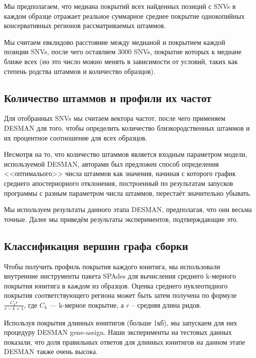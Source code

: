 \documentclass{spbau-diploma}
\begin{document}
Мы предполагаем, что медиана покрытий всех найденных позиций с SNVs в каждом образце отражает реальное суммарное среднее покрытие однокопийных консервативных регионов рассматриваемых штаммов. 

Мы считаем евклидово расстояние между медианой и покрытием каждой позиции SNVs, после чего оставляем 3000 SNVs, покрытие которых к медиане ближе всех (но это число можно менять в зависимости от условий, таких как степень родства штаммов и количество образцов).

\subsection{Количество штаммов и профили их частот}

Для отобранных SNVs мы считаем вектора частот, после чего применяем DESMAN для того, чтобы определить количество близкородственных штаммов и их процентное соотношение для всех образцов. 

Несмотря на то, что количество штаммов является входным параметром модели, используемой DESMAN, авторами был предложен способ определения <<оптималього>> числа штаммов как значения, начиная с которого график среднего апостериорного отклонения, построенный по результатам запусков программы с разным параметром числа штаммов, перестаёт значительно убывать. 

Мы используем результаты данного этапа DESMAN, предполагая, что они весьма точные. Далее мы приведём результаты экспериментов, подтверждающие это.

\subsection{Классификация вершин графа сборки}

Чтобы получить профиль покрытия каждого юнитига, мы использовали внутренние инструменты пакета SPAdes для вычисления среднего k-мерного покрытия юнитига в каждом из образцов. Оценка среднего нуклеотидного покрытия соответствующего региона может быть затем получена по формуле $\frac{C_k r}{r - k + 1}$, где $C_k$ --- k-мерное покрытие, а $r$ -- средняя длина ридов. 

Используя покрытия длинных юнитигов (больше 1кб), мы запускаем для них процедуру DESMAN gene-assign.
Наши эксперименты на тестовых данных показали, что доля правильных ответов для длинных юнитигов на данном этапе DESMAN также очень высока.
\end{document}
